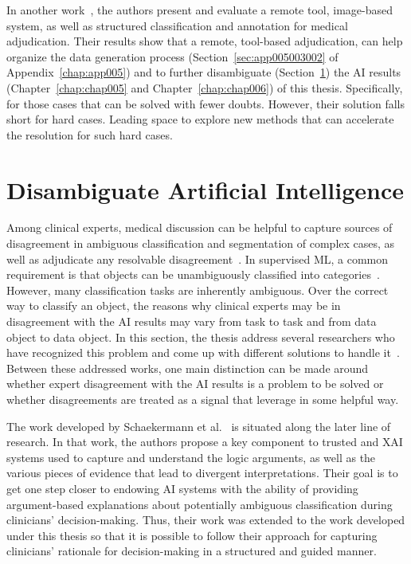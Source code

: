 In another work~\cite{10.1167/tvst.8.6.40}, the authors present and evaluate a remote tool, image-based system, as well as structured classification and annotation for medical adjudication.
Their results show that a remote, tool-based adjudication, can help organize the data generation process (Section~\ref{sec:app005003002} of Appendix~\ref{chap:app005}) and to further disambiguate (Section~\ref{sec:chap003007}) the \ac{AI} results (Chapter~\ref{chap:chap005} and Chapter~\ref{chap:chap006}) of this thesis.
Specifically, for those cases that can be solved with fewer doubts.
However, their solution falls short for hard cases.
Leading space to explore new methods that can accelerate the resolution for such hard cases.

\section{Disambiguate Artificial Intelligence}
\label{sec:chap003007}

Among clinical experts, medical discussion can be helpful to capture sources of disagreement in ambiguous classification and segmentation of complex cases, as well as adjudicate any resolvable disagreement~\cite{10.1145/3308560.3317085}.
In supervised \ac{ML}, a common requirement is that objects can be unambiguously classified into categories~\cite{10.1145/3287560.3287596}.
However, many classification tasks are inherently ambiguous.
Over the correct way to classify an object, the reasons why clinical experts may be in disagreement with the \ac{AI} results may vary from task to task and from data object to data object.
In this section, the thesis address several researchers who have recognized this problem and come up with different solutions to handle it~\cite{10.1145/3313831.3376506, 10.1145/3313831.3376590, Tschandl2020}.
Between these addressed works, one main distinction can be made around whether expert disagreement with the \ac{AI} results is a problem to be solved or whether disagreements are treated as a signal that leverage in some helpful way.

The work developed by Schaekermann et al.~\cite{10.1145/3308560.3317085} is situated along the later line of research.
In that work, the authors propose a key component to trusted and \ac{XAI} systems used to capture and understand the logic arguments, as well as the various pieces of evidence that lead to divergent interpretations.
Their goal is to get one step closer to endowing \ac{AI} systems with the ability of providing argument-based explanations about potentially ambiguous classification during clinicians' decision-making.
Thus, their work was extended to the work developed under this thesis so that it is possible to follow their approach for capturing clinicians' rationale for decision-making in a structured and guided manner.

